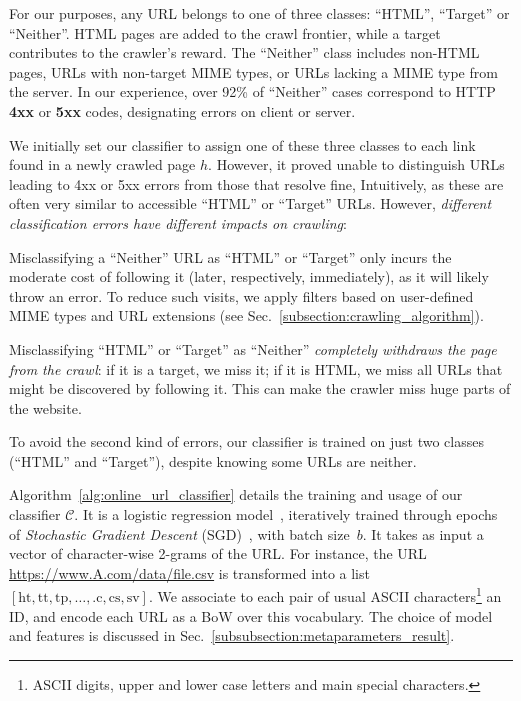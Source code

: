 For our purposes, any URL belongs to one of three classes:  ``HTML'',
``Target'' or ``Neither''. HTML pages are added to the crawl frontier, while a target contributes to the crawler's reward. The ``Neither'' class includes non-HTML pages, URLs with non-target MIME types, or URLs lacking a MIME type from the server. In our experience, over 92\% of ``Neither'' cases correspond to HTTP \textbf{4xx} or \textbf{5xx} codes, designating errors on client or server.

We initially set our classifier to assign one of these three classes to each link found in a newly crawled page $h$.
However, it proved unable to distinguish URLs leading to 4xx or 5xx errors  from those that resolve fine, Intuitively, as these are often very similar to accessible ``HTML'' or ``Target'' URLs. However, \emph{different classification errors have different impacts on crawling}:
\begin{inparaenum}
	\item Misclassifying a ``Neither'' URL as ``HTML'' or ``Target'' only incurs the moderate cost of following it (later, respectively, immediately), as it will likely throw an error. To reduce such visits, we apply filters based on user-defined MIME types and URL extensions (see Sec.~\ref{subsection:crawling_algorithm}).
	\item Misclassifying ``HTML'' or ``Target'' as ``Neither''  \emph{completely withdraws the page from the crawl}: if it is a target, we miss it; if it is HTML, we miss all URLs that might be discovered by following it. This can make the crawler miss huge parts of the website.
\end{inparaenum}
To avoid the second kind of errors, our classifier is trained on just two classes (``HTML'' and ``Target''), despite knowing some URLs are neither.

Algorithm~\ref{alg:online_url_classifier} details the training and usage of our classifier $\mathcal{C}$. It is a logistic regression model~\cite{james2013introduction}, iteratively trained through epochs of \emph{Stochastic Gradient Descent} (SGD)~\cite{bottou2010large}, with batch size~$b$. It takes as input a vector of character-wise 2-grams of the URL. For instance, the URL \url{https://www.A.com/data/file.csv} is transformed into a list
$\left[\textrm{ht}, \textrm{tt}, \textrm{tp}, \dots, \textrm{.c}, \textrm{cs}, \textrm{sv}\right]$. We associate to each pair of usual ASCII characters\footnote{ASCII digits, upper and lower case letters and main special characters.} an ID, and encode each URL as a BoW over this vocabulary. The choice of model and features is discussed in Sec.~\ref{subsubsection:metaparameters_result}.

